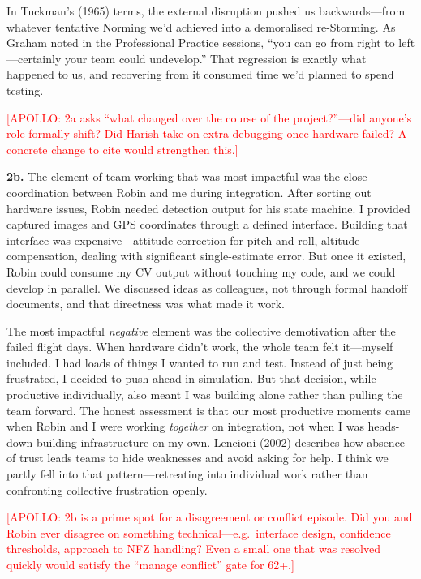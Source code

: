 In Tuckman's (1965) terms, the external disruption pushed us backwards---from whatever tentative Norming we'd achieved into a demoralised re-Storming. As Graham noted in the Professional Practice sessions, ``you can go from right to left---certainly your team could undevelop.'' That regression is exactly what happened to us, and recovering from it consumed time we'd planned to spend testing.

\textcolor{red}{[APOLLO: 2a asks ``what changed over the course of the project?''---did anyone's role formally shift? Did Harish take on extra debugging once hardware failed? A concrete change to cite would strengthen this.]}

\textbf{2b.}
The element of team working that was most impactful was the close coordination between Robin and me during integration. After sorting out hardware issues, Robin needed detection output for his state machine. I provided captured images and GPS coordinates through a defined interface. Building that interface was expensive---attitude correction for pitch and roll, altitude compensation, dealing with significant single-estimate error. But once it existed, Robin could consume my CV output without touching my code, and we could develop in parallel. We discussed ideas as colleagues, not through formal handoff documents, and that directness was what made it work.

The most impactful \emph{negative} element was the collective demotivation after the failed flight days. When hardware didn't work, the whole team felt it---myself included. I had loads of things I wanted to run and test. Instead of just being frustrated, I decided to push ahead in simulation. But that decision, while productive individually, also meant I was building alone rather than pulling the team forward. The honest assessment is that our most productive moments came when Robin and I were working \emph{together} on integration, not when I was heads-down building infrastructure on my own. Lencioni (2002) describes how absence of trust leads teams to hide weaknesses and avoid asking for help. I think we partly fell into that pattern---retreating into individual work rather than confronting collective frustration openly.

\textcolor{red}{[APOLLO: 2b is a prime spot for a disagreement or conflict episode. Did you and Robin ever disagree on something technical---e.g.\ interface design, confidence thresholds, approach to NFZ handling? Even a small one that was resolved quickly would satisfy the ``manage conflict'' gate for 62+.]}

